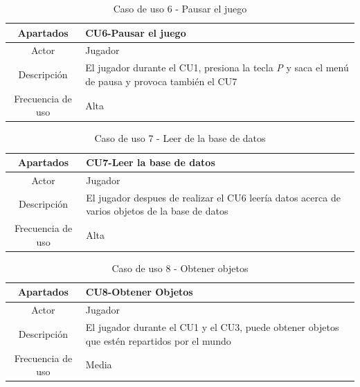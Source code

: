 \documentclass[a4paper]{article}
\begin{document}
\begin{table}[!ht]
    \centering
    \begin{tabular}{|c|p{12cm}|} 
        \hline
        \textbf{Apartados}       & \textbf{CU6-Pausar el juego} \\
        \hline
        Actor                    & Jugador \\
        \hline
        Descripción              & El jugador durante el CU1, presiona la tecla \textit{P} y saca el menú de pausa y provoca también el CU7 \\
        \hline
        Frecuencia de uso        & Alta \\
        \hline
    \end{tabular}
    \caption{Caso de uso 6 - Pausar el juego}
    \label{tab:casosdeuso6-table}
\end{table}

\begin{table}[ht]
    \centering
    \begin{tabular}{|c|p{12cm}|} 
        \hline
        \textbf{Apartados}       & \textbf{CU7-Leer la base de datos} \\
        \hline
        Actor                    & Jugador \\
        \hline
        Descripción              & El jugador despues de realizar el CU6 leería datos acerca de varios objetos de la base de datos \\
        \hline
        Frecuencia de uso        & Alta \\
        \hline
    \end{tabular}
    \caption{Caso de uso 7 - Leer de la base de datos}
    \label{tab:casosdeuso7-table}
\end{table}

\begin{table}[ht]
    \centering
    \begin{tabular}{|c|p{12cm}|} 
        \hline
        \textbf{Apartados}       & \textbf{CU8-Obtener Objetos} \\
        \hline
        Actor                    & Jugador \\
        \hline
        Descripción              & El jugador durante el CU1 y el CU3, puede obtener objetos que estén repartidos por el mundo \\
        \hline
        Frecuencia de uso        & Media \\
        \hline
    \end{tabular}
    \caption{Caso de uso 8 - Obtener objetos}
    \label{tab:casosdeuso8-table}
\end{table}
\end{document}
